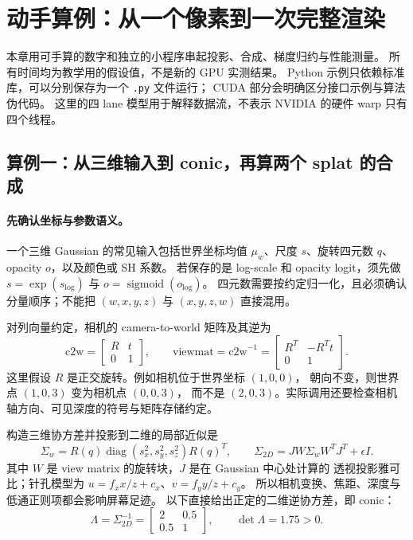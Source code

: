 \section{动手算例：从一个像素到一次完整渲染}

本章用可手算的数字和独立的小程序串起投影、合成、梯度归约与性能测量。
所有时间均为教学用的假设值，不是新的 GPU 实测结果。
Python 示例只依赖标准库，可以分别保存为一个 \texttt{.py} 文件运行；
CUDA 部分会明确区分接口示例与算法伪代码。
这里的四 lane 模型用于解释数据流，不表示 NVIDIA 的硬件 warp 只有四个线程。

\subsection{算例一：从三维输入到 conic，再算两个 splat 的合成}

\paragraph{先确认坐标与参数语义。}
一个三维 Gaussian 的常见输入包括世界坐标均值
\(\mu_w\)、尺度 \(s\)、旋转四元数 \(q\)、opacity \(o\)，以及颜色或 SH 系数。
若保存的是 log-scale 和 opacity logit，须先做
\(s=\exp(s_{\log})\) 与 \(o=\operatorname{sigmoid}(o_{\log})\)。
四元数需要按约定归一化，且必须确认分量顺序；不能把
\((w,x,y,z)\) 与 \((x,y,z,w)\) 直接混用。

对列向量约定，相机的 camera-to-world 矩阵及其逆为
\[
 \mathrm{c2w}=\begin{bmatrix}R&t\\0&1\end{bmatrix},\qquad
 \mathrm{viewmat}=\mathrm{c2w}^{-1}
 =\begin{bmatrix}R^T&-R^Tt\\0&1\end{bmatrix}.
\]
这里假设 \(R\) 是正交旋转。例如相机位于世界坐标 \((1,0,0)\)，
朝向不变，则世界点 \((1,0,3)\) 变为相机点 \((0,0,3)\)，
而不是 \((2,0,3)\)。实际调用还要检查相机轴方向、可见深度的符号与矩阵存储约定。

构造三维协方差并投影到二维的局部近似是
\[
 \Sigma_w=R(q)\operatorname{diag}(s_x^2,s_y^2,s_z^2)R(q)^T,
 \qquad \Sigma_{2D}=JW\Sigma_wW^TJ^T+\epsilon I.
\]
其中 \(W\) 是 view matrix 的旋转块，\(J\) 是在 Gaussian 中心处计算的
透视投影雅可比；针孔模型为 \(u=f_x x/z+c_x\)、\(v=f_y y/z+c_y\)。
所以相机变换、焦距、深度与低通正则项都会影响屏幕足迹。
以下直接给出正定的二维逆协方差，即 conic：
\[
 \Lambda=\Sigma_{2D}^{-1}=\begin{bmatrix}2&0.5\\0.5&1\end{bmatrix},
 \qquad \det\Lambda=1.75>0.
\]

